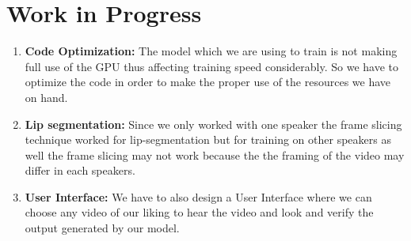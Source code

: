     \chapter{Work in Progress}
   
\begin{enumerate}
    \item \textbf{Code Optimization:}
       The model which we are using to train is not making full use of the GPU thus affecting training speed considerably. So we have to optimize the code in order to make the proper use of the resources we have on hand.
       
    \item \textbf{Lip segmentation:}
       Since we only worked with one speaker the frame slicing technique worked for lip-segmentation but for training on other speakers as well the frame slicing may not work because the the framing of the video may differ in each speakers.

    \item \textbf{User Interface:}
       We have to also design a User Interface where we can choose any video of our liking to hear the video and look and verify the output generated by our model.
       
\end{enumerate}
       
 


